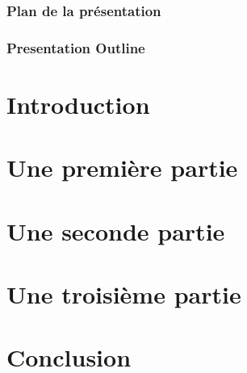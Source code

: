 \documentclass[compress,usepdftitle=false]{beamer}
\begin{document}
\begin{frame}
  \titlepage
\end{frame}

\begin{frame}
 {\frametitle{Plan de la présentation}}
 {\frametitle{Presentation Outline}}
\tableofcontents
\end{frame}


\section[Introduction]{Introduction}
%


\section[Partie UN]{Une première partie}
%

\section[Partie DEUX]{Une seconde partie}
%

\section[Partie TROIS]{Une troisième partie}
%

\section[Conclusion]{Conclusion}
%
\end{document}
